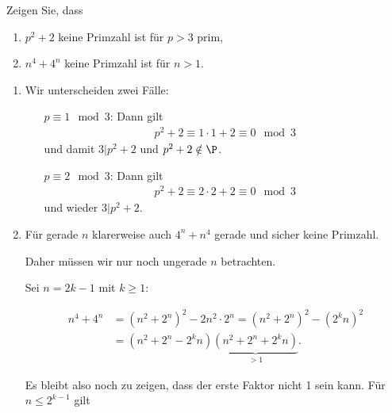
\begin{exercise}

Zeigen Sie, dass

\begin{enumerate}
  \item $p^2 + 2$ keine Primzahl ist für $p > 3$ prim,
  \item $n^4 + 4^n$ keine Primzahl ist für $n > 1$.
\end{enumerate}

\end{exercise}


\begin{solution}

\phantom{}

\begin{enumerate}
  \item Wir unterscheiden zwei Fälle:
  \begin{itemize}
    \item[$p \equiv 1 \mod{3}$:]
    Dann gilt
    \begin{align*}
      p^2 + 2 \equiv 1 \cdot 1 + 2 \equiv 0 \mod{3}
    \end{align*}
    und damit $3 | p^2 + 2$ und $p^2 + 2 \notin \P$.
    \item[$p \equiv 2 \mod{3}$:]
    Dann gilt
    \begin{align*}
      p^2 + 2 \equiv 2 \cdot 2 + 2 \equiv 0 \mod{3}
    \end{align*}
    und wieder $3 | p^2 + 2$.
  \end{itemize}
  \item 
  Für gerade $n$ klarerweise auch $4^n + n^4$ gerade und sicher keine Primzahl.

  Daher müssen wir nur noch ungerade $n$ betrachten.


  Sei $n = 2k - 1$ mit $k \geq 1$:

  \begin{align*}
    n^4 + 4^n &= (n^2 + 2^n)^2 - 2n^2\cdot2^n = (n^2 + 2^n)^2 - (2^k n)^2 \\
    &= (n^2 + 2^n - 2^k n)\underbrace{(n^2 + 2^n + 2^k n)}_{>1}.
  \end{align*}

  Es bleibt also noch zu zeigen, dass der erste Faktor nicht 1 sein kann.
  Für $n \leq 2^{k-1}$ gilt


\end{enumerate}
\end{solution}
